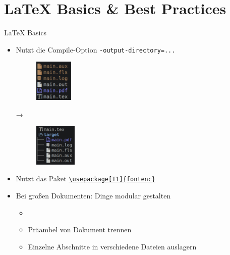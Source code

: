 \documentclass[main.tex]{subfiles}
\begin{document}
\section{\LaTeX{} Basics \& Best Practices}

\begin{frame}[fragile]{\LaTeX{} Basics}
	\begin{itemize}
		\item Nutzt die Compile-Option \texttt{-output-directory=...}
		      \pause
		      \bigskip
		      \begin{center}
			      \begin{minipage}{0.33\textwidth}
				      \begin{figure}[H]
					      \centering
					      \includegraphics[height=2cm]{images/CompileOutput}
					      \label{fig:CompileOutput}
				      \end{figure}
			      \end{minipage}
			      \begin{minipage}{0.055\textwidth}
				      →
			      \end{minipage}
			      \begin{minipage}{0.33\textwidth}
				      \begin{figure}[H]
					      \centering
					      \includegraphics[height=2cm]{images/CompileOutputWithTarget}
					      \label{fig:CompileOutputWithTarget}
				      \end{figure}
			      \end{minipage}
		      \end{center}
		      \pause

		      \bigskip
		\item Nutzt das Paket \texttt{\href{https://tex.stackexchange.com/a/677}{\textbackslash usepackage[T1]\{fontenc\}}}
		      \pause
		      \medskip
		\item Bei großen Dokumenten: Dinge modular gestalten
		      \begin{itemize}
			      \item \verb||
			      \item Präambel von Dokument trennen
			      \item Einzelne Abschnitte in verschiedene Dateien auslagern
		      \end{itemize}

	\end{itemize}
\end{frame}
\end{document}

